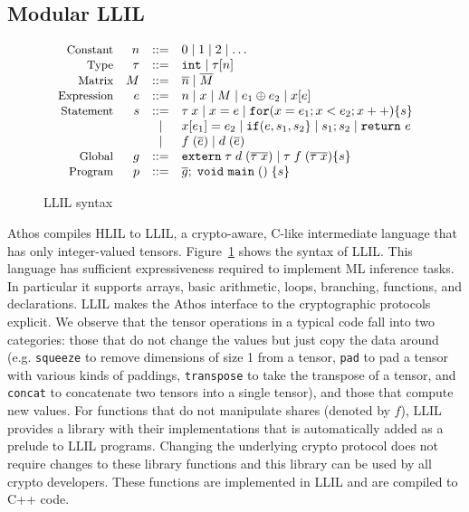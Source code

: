 \subsection{Modular LLIL}
\label{sec:athosmodularity}

\begin{figure}[htp]
  \footnotesize
  \[
  \begin{array}{rrcl}
    \ftext{Constant} & n & ::= & 0 \mid 1 \mid 2 \mid \ldots\\
    \ftext{Type} & \tau &::=& \kw{int} \mid \tau[n] \\
    \ftext{Matrix} & M & ::= & \overline{n} \mid \overline{M}\\
    \ftext{Expression} & e &::=& n \mid x \mid M \mid e_{1} \oplus e_{2} \mid x[e]\\
    \ftext{Statement} & s &::=& \tau\:x \mid x = e \mid \kw{for}(x=e_{1};x<e_{2};x++)\{s\}\\
    & & \mid& x[e_{1}] = e_{2} \mid \kw{if}(e, s_{1}, s_2\} \mid
    s_{1}; s_{2} \mid \kw{return}\ e\\
    & & \mid & f\;(\overline{e}) \mid d\;(\overline{e})\\
    \ftext{Global} & g & ::= &\kw{extern}\;\tau\;d\;(\overline{\tau\;x}) \mid \tau\;f\;(\overline{\tau\;x})\{s\}\\
    \ftext{Program} & p & ::= & \overline{g};\;\kw{void}\ \kw{main}\;()\;\{s\}
  \end{array}
  \]
\caption{LLIL syntax}
\label{fig:lil}
\end{figure}

Athos compiles HLIL to LLIL, a crypto-aware, C-like intermediate
language that has only integer-valued tensors. Figure~\ref{fig:lil}
shows the syntax of LLIL. This language  has sufficient expressiveness
required to implement ML inference tasks. In particular it supports
arrays, basic arithmetic, loops, branching, functions, and 
declarations.
%
LLIL makes the Athos interface to the \mpc cryptographic protocols
explicit. We observe that the tensor operations in a typical
\tensorflow code fall into two categories: those that do not change
the values but just copy the data around (e.g. {\tt squeeze} to remove
dimensions of size 1 from a tensor, {\tt pad} to pad a tensor with
various kinds of paddings, {\tt transpose} to take the transpose of a
tensor, and {\tt concat} to concatenate two tensors into a single
tensor), and those that compute new values.
%
For functions that do not manipulate shares (denoted by $f$), LLIL
provides a library with their
implementations that is automatically added as a prelude to LLIL
programs. Changing the underlying crypto protocol does not require
changes to these library functions and this library can be used by all
crypto developers. These functions are implemented in LLIL and are
compiled to C++ code.

